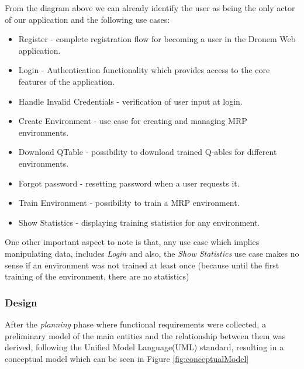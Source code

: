 From the diagram above we can already identify the user as being the only actor of our application and the following use cases:
\begin{itemize}
    \item Register - complete registration flow for becoming a user in the Dronem Web application.
    \item Login - Authentication functionality which provides access to the core features of the application.
    \item Handle Invalid Credentials - verification of user input at login.
    \item Create Environment - use case for creating and managing MRP environments.
    \item Download QTable - possibility to download trained Q-ables for different environments.
    \item Forgot password - resetting password when a user requests it.
    \item Train Environment - possibility to train a MRP environment.
    \item Show Statistics - displaying training statistics for any environment.
\end{itemize}

One other important aspect to note is that, any use case which implies manipulating data, includes \emph{Login} and also, the \emph{Show Statistics} use case makes no sense if an environment was not trained at least once (because until the first training of the environment, there are no statistics)

\subsubsection{Design}
After the \emph{planning} phase where functional requirements were collected, a preliminary model of the main entities and the relationship between them was derived, following the Unified Model Language(UML)\cite{uml} standard, resulting in a conceptual model which can be seen in Figure \ref{fig:conceptualModel}

